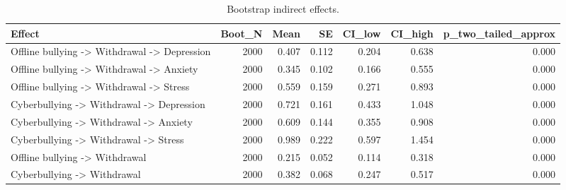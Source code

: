 \begin{table}
\caption{Bootstrap indirect effects.}
\label{tab:indirect}
\begin{tabular}{lrrrrrr}
\toprule
Effect & Boot_N & Mean & SE & CI_low & CI_high & p_two_tailed_approx \\
\midrule
Offline bullying -> Withdrawal -> Depression & 2000 & 0.407 & 0.112 & 0.204 & 0.638 & 0.000 \\
Offline bullying -> Withdrawal -> Anxiety & 2000 & 0.345 & 0.102 & 0.166 & 0.555 & 0.000 \\
Offline bullying -> Withdrawal -> Stress & 2000 & 0.559 & 0.159 & 0.271 & 0.893 & 0.000 \\
Cyberbullying -> Withdrawal -> Depression & 2000 & 0.721 & 0.161 & 0.433 & 1.048 & 0.000 \\
Cyberbullying -> Withdrawal -> Anxiety & 2000 & 0.609 & 0.144 & 0.355 & 0.908 & 0.000 \\
Cyberbullying -> Withdrawal -> Stress & 2000 & 0.989 & 0.222 & 0.597 & 1.454 & 0.000 \\
Offline bullying -> Withdrawal & 2000 & 0.215 & 0.052 & 0.114 & 0.318 & 0.000 \\
Cyberbullying -> Withdrawal & 2000 & 0.382 & 0.068 & 0.247 & 0.517 & 0.000 \\
\bottomrule
\end{tabular}
\end{table}
